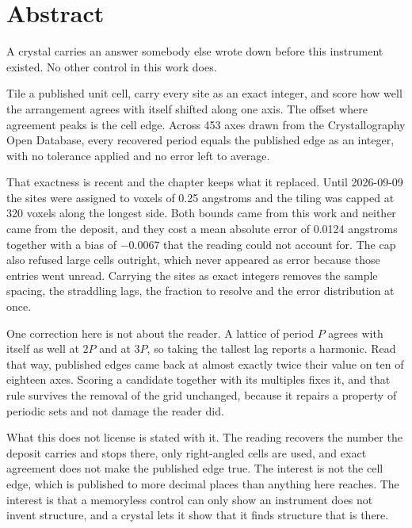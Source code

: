 \chapter*{Abstract}

A crystal carries an answer somebody else wrote down before this instrument existed. No other
control in this work does.

Tile a published unit cell, carry every site as an exact integer, and score how well the arrangement
agrees with itself shifted along one axis. The offset where agreement peaks is the cell edge. Across
453 axes drawn from the Crystallography Open Database, every recovered period equals the published
edge as an integer, with no tolerance applied and no error left to average.

That exactness is recent and the chapter keeps what it replaced. Until 2026-09-09 the sites were
assigned to voxels of 0.25 angstroms and the tiling was capped at 320 voxels along the longest side.
Both bounds came from this work and neither came from the deposit, and they cost a mean absolute
error of 0.0124 angstroms together with a bias of $-0.0067$ that the reading could not account for.
The cap also refused large cells outright, which never appeared as error because those entries went
unread. Carrying the sites as exact integers removes the sample spacing, the straddling lags, the
fraction to resolve and the error distribution at once.

One correction here is not about the reader. A lattice of period $P$ agrees with itself as well at
$2P$ and at $3P$, so taking the tallest lag reports a harmonic. Read that way, published edges came
back at almost exactly twice their value on ten of eighteen axes. Scoring a candidate together with
its multiples fixes it, and that rule survives the removal of the grid unchanged, because it repairs
a property of periodic sets and not damage the reader did.

What this does not license is stated with it. The reading recovers the number the deposit carries
and stops there, only right-angled cells are used, and exact agreement does not make the
published edge true. The interest is not the cell edge, which is published to more decimal places
than anything here reaches. The interest is that a memoryless control can only show an instrument
does not invent structure, and a crystal lets it show that it finds structure that is there.
\cleardoublepage
